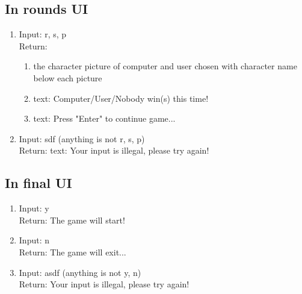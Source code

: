 \documentclass[12pt]{article}
\begin{document}
	\subsection{In rounds UI}

		\begin{enumerate}[$\bullet$]
			\item Input: r, s, p\\
			Return:
			\begin{enumerate}[1)]
				\item the character picture of computer and user chosen with character name below each picture
				\item text: Computer/User/Nobody win(s) this time!
				\item text: Press "Enter" to continue game...
			\end{enumerate}
		
			\item Input: sdf (anything is not r, s, p)\\
			Return: text: Your input is illegal, please try again!
		\end{enumerate}

	\subsection{In final UI}

		\begin{enumerate}[$\bullet$]
			\item Input: y\\
			Return: The game will start!
			\item Input: n\\
			Return: The game will exit...
			\item Input: asdf (anything is not y, n)\\
			Return: Your input is illegal, please try again!
		\end{enumerate}
	
\end{document}
